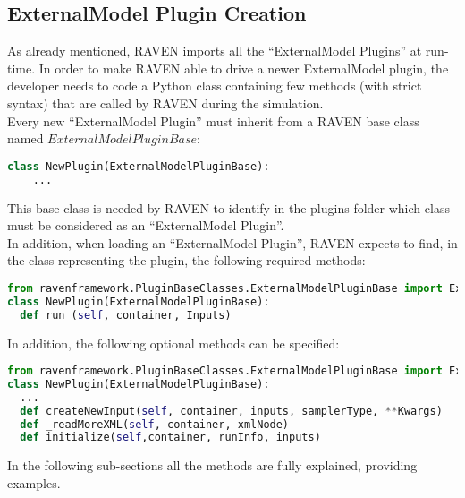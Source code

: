 \subsection{ExternalModel Plugin Creation}
\label{subsec:externalModelPluginCreation}
As already mentioned, RAVEN imports all the ``ExternalModel Plugins'' at run-time.
In order to make RAVEN
able to drive a newer ExternalModel plugin, the developer needs to code a Python class
containing few methods (with strict syntax) that are called by RAVEN during the simulation.
\\ Every new ``ExternalModel Plugin'' must inherit from a RAVEN base class named
$ExternalModelPluginBase$:
\begin{lstlisting}[language=python]
  class NewPlugin(ExternalModelPluginBase):
    ...
\end{lstlisting}
This base class is needed by RAVEN to identify in the plugins folder which class must
be considered as an ``ExternalModel Plugin''.
\\ In addition, when loading an ``ExternalModel Plugin'', RAVEN expects to find, in the class representing the plugin,
 the following required methods:
\begin{lstlisting}[language=python, basicstyle=\scriptsize\ttfamily, breaklines=True, columns=fullflexible]
from ravenframework.PluginBaseClasses.ExternalModelPluginBase import ExternalModelPluginBase
class NewPlugin(ExternalModelPluginBase):
  def run (self, container, Inputs)
\end{lstlisting}
In addition, the following optional methods can be specified:
\begin{lstlisting}[language=python, basicstyle=\scriptsize\ttfamily, breaklines=True, columns=fullflexible]
from ravenframework.PluginBaseClasses.ExternalModelPluginBase import ExternalModelPluginBase
class NewPlugin(ExternalModelPluginBase):
  ...
  def createNewInput(self, container, inputs, samplerType, **Kwargs)
  def _readMoreXML(self, container, xmlNode)
  def initialize(self,container, runInfo, inputs)
\end{lstlisting}
In the following sub-sections all the methods are fully explained, providing examples.
